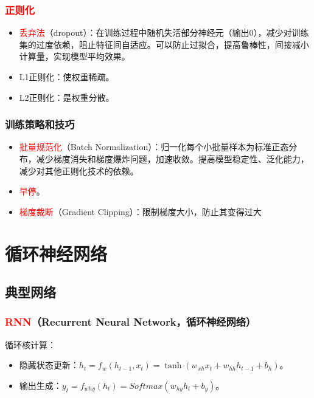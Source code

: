 \documentclass[
12pt, %
a4paper, 
oneside, %
]{scrartcl}
\begin{document}
\subsubsection[正则化]{\textcolor{red}{正则化}}
\begin{itemize}
\item \textcolor{red}{丢弃法}（dropout）：在训练过程中随机失活部分神经元（输出$ 0 $），减少对训练集的过度依赖，阻止特征间自适应。可以防止过拟合，提高鲁棒性，间接减小计算量，实现模型平均效果。
\item L1正则化：使权重稀疏。
\item L2正则化：是权重分散。
\end{itemize}
\subsubsection[训练策略和技巧]{训练策略和技巧}
\begin{itemize}
\item \textcolor{red}{批量规范化}（Batch Normalization）：归一化每个小批量样本为标准正态分布，减少梯度消失和梯度爆炸问题，加速收敛。提高模型稳定性、泛化能力，减少对其他正则化技术的依赖。
\item \textcolor{red}{早停}。
\item \textcolor{red}{梯度裁断}（Gradient Clipping）：限制梯度大小，防止其变得过大
\end{itemize}
\section{循环神经网络}
\subsection[典型网络]{典型网络}
\subsubsection[RNN]{\textcolor{red}{RNN}（Recurrent Neural Network，循环神经网络）}
循环核计算：
\begin{itemize}
\item 隐藏状态更新：$ h_t = f_w(h_{t - 1}, x_t) = \tanh(w_{xh}x_t + w_{hh}h_{t - 1} + b_h) $。
\item 输出生成：$ y_t = f_{why}(h_t) = Softmax(w_{hy}h_t + b_y) $。
\end{itemize}
\end{document}
